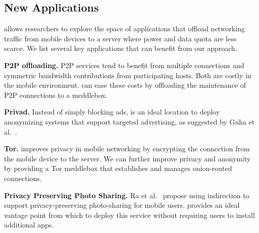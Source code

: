 \subsection{New Applications}
\label{subsec:newapps}

\meddle allows researchers to explore the space of applications that offload 
networking traffic from mobile devices to a server where power and data quota 
are less scarce. We list several key applications that can benefit 
from our approach.

\begin{packeditemize}
\item \textbf{P2P offloading.} P2P services tend to benefit from multiple connections 
and symmetric bandwidth contributions from participating hosts. Both are 
costly in the mobile environment. \meddle can ease these costs by offloading the 
maintenance of P2P connections to a meddlebox.
\item \textbf{Privad.}  Instead of simply blocking ads, \meddle is an ideal location 
to deploy anonymizing systems that support targeted advertising, as suggested by 
Guha et al.~\cite{guha:privad}. 
\item \textbf{Tor.} \meddle improves privacy in mobile networking by encrypting the 
connection from the mobile device to the \meddle server. We can further improve 
privacy and anonymity by providing a Tor meddlebox that establishes and manages 
onion-routed connections.
\item \textbf{Privacy Preserving Photo Sharing.} Ra et al.~\cite{ra:p3} propose 
using indirection to support privacy-preserving photo-sharing for mobile users. \meddle 
provides an ideal vantage point from which to deploy this service without requiring 
users to install additional apps. 

\end{packeditemize}


